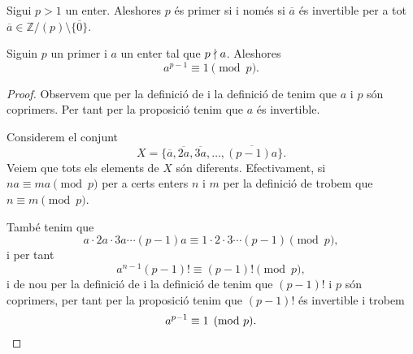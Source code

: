\documentclass[../../Main.tex]{subfiles}
\begin{document}
	\begin{corollary}
		\label{corollary:Z/(p) és un cos}
		\label{corollary:Z/(p) és un cos sii p és primer}
		Sigui \(p>1\) un enter. Aleshores \(p\) és primer si i només si \(\overline{a}\) és invertible per a tot \(\overline{a}\in\mathbb{Z}/(p)\setminus\{\overline{0}\}\).
	\end{corollary}
	\begin{theorem}
		\label{thm:el Petit Teorema de Fermat}
		Siguin \(p\) un primer i \(a\) un enter tal que \(p\mathrel{\nmid} a\). Aleshores
		\[a^{p-1}\equiv1\pmod{p}.\]
		\begin{proof}
			Observem que per la definició de  i la definició de  tenim que \(a\) i \(p\) són coprimers. Per tant per la proposició  tenim que \(a\) és invertible.
			
			Considerem el conjunt
			\[X=\{\overline{a},\overline{2a},\overline{3a},\dots,\overline{(p-1)a}\}.\]
			Veiem que tots els elements de \(X\) són diferents. Efectivament, si \(na\equiv ma\pmod{p}\) per a certs enters \(n\) i \(m\) per la definició de  trobem que \(n\equiv m\pmod{p}\).
			
			També tenim que %
			\[a\cdot2a\cdot3a\cdots(p-1)a\equiv 1\cdot2\cdot3\cdots(p-1)\pmod{p},\]
			i per tant
			\[a^{n-1}(p-1)!\equiv(p-1)!\pmod{p},\]
			i de nou per la definició de  i la definició de  tenim que \((p-1)!\) i \(p\) són coprimers, per tant per la proposició  tenim que \((p-1)!\) és invertible i trobem
			\[a^{p-1}\equiv1\pmod{p}.\qedhere\]
		\end{proof}
	\end{theorem}
\end{document}
